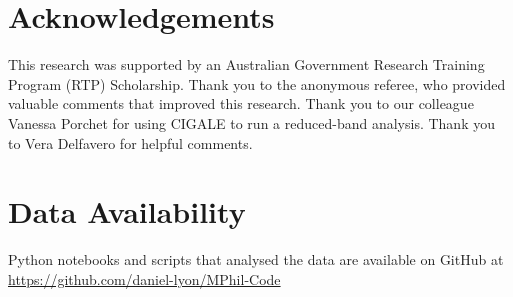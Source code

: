 \section*{Acknowledgements}
This research was supported by an Australian Government Research Training Program (RTP) Scholarship. Thank you to the anonymous referee, who provided valuable comments that improved this research. Thank you to our colleague Vanessa Porchet for using CIGALE to run a reduced-band analysis. Thank you to Vera Delfavero for helpful comments.

\section*{Data Availability}
Python notebooks and scripts that analysed the data are available on GitHub at \url{https://github.com/daniel-lyon/MPhil-Code}